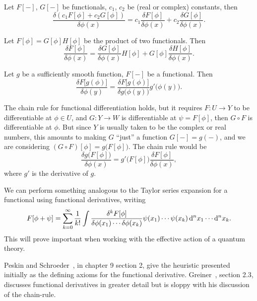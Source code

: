 \begin{theorem}[Linearity]
Let $F[-]$, $G[-]$ be functionals, $c_{1}$, $c_{2}$ be (real or complex)
constants, then
\begin{equation}
\frac{\delta(c_{1}F[\phi]+c_{2}G[\phi])}{\delta\phi(x)}
=c_{1}\frac{\delta F[\phi]}{\delta\phi(x)}
+c_{2}\frac{\delta G[\phi]}{\delta\phi(x)}.
\end{equation}
\end{theorem}

\begin{theorem}
Let $F[\phi]=G[\phi]H[\phi]$ be the product of two functionals.
Then
\begin{equation}
\frac{\delta F[\phi]}{\delta\phi(x)}
=\frac{\delta G[\phi]}{\delta\phi(x)}
H[\phi] + G[\phi]\frac{\delta H[\phi]}{\delta\phi(x)}.
\end{equation}
\end{theorem}

\begin{theorem}
Let $g$ be a sufficiently smooth function, $F[-]$ be a functional.
Then
\begin{equation}
\frac{\delta F\bigl[g(\phi)\bigr]}{\delta\phi(y)}
=\frac{\delta F\bigl[g(\phi)\bigr]}{\delta g\bigl(\phi(y)\bigr)}g'\bigl(\phi(y)\bigr).
\end{equation}
\end{theorem}

\begin{remark}
The chain rule for functional differentiation holds, but it requires
$F\colon U\to Y$ to be differentiable at $\phi\in U$, and $G\colon Y\to W$
is differentiable at $\psi=F[\phi]$, then $G\circ F$ is differentiable
at $\phi$. But since $Y$ is usually taken to be the complex or real
numbers, this amounts to making $G$ ``just'' a function $G[-]=g(-)$, and we are
considering $(G\circ F)[\phi] = g\bigl(F[\phi]\bigr)$. The chain rule
would be
\begin{equation}
\frac{\delta g\bigl(F[\phi]\bigr)}{\delta\phi(x)} = g'\bigl(F[\phi]\bigr)
\frac{\delta F[\phi]}{\delta\phi(x)},
\end{equation}
where $g'$ is the derivative of $g$.
\end{remark}

We can perform something analogous to the Taylor series expansion for a
functional using functional derivatives, writing
\begin{equation}
F[\phi + \psi] =\sum^{\infty}_{k=0}\frac{1}{k!}\int\frac{\delta^{k}F[\phi]}{\delta\phi(x_{1})\cdots\delta\phi(x_{k})}\psi(x_{1})\cdots\psi(x_{k})\,\mathrm{d}^{n}x_{1}\cdots\mathrm{d}^{n}x_{k}.
\end{equation}
This will prove important when working with the effective action of a
quantum theory.

Peskin and Schroeder~\cite{Peskin:1995ev}, in chapter 9 section 2, give
the heuristic presented initially as the defining axioms for the
functional derivative. Greiner~\cite{Greiner:1996zu}, section 2.3, discusses
functional derivatives in greater detail but is sloppy with his
discussion of the chain-rule.
